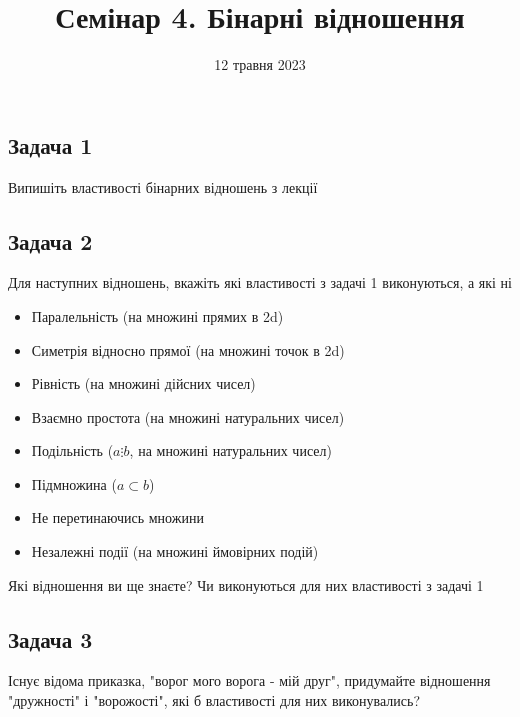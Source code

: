 \documentclass{article}
\begin{document}
\title{Семінар 4. Бінарні відношення}
\date{12 травня 2023}

\maketitle

\subsection*{Задача 1}
Випишіть властивості бінарних відношень з лекції

\subsection*{Задача 2}
Для наступних відношень, вкажіть які властивості з задачі 1 виконуються, а які ні
\begin{itemize}
    \item Паралельність (на множині прямих в 2d)
    \item Симетрія відносно прямої (на множині точок в 2d)
    \item Рівність (на множині дійсних чисел)
    \item Взаємно простота (на множині натуральних чисел)
    \item Подільність ($a \vdots b$, на множині натуральних чисел)
    \item Підмножина ($a \subset b$)
    \item Не перетинаючись множини
    \item Незалежні події (на множині ймовірних подій)
\end{itemize}
Які відношення ви ще знаєте? Чи виконуються для них властивості з задачі 1

\subsection*{Задача 3}
Існує відома приказка, "ворог мого ворога - мій друг", придумайте відношення "дружності" і "ворожості", які б властивості для них виконувались?
\end{document}
